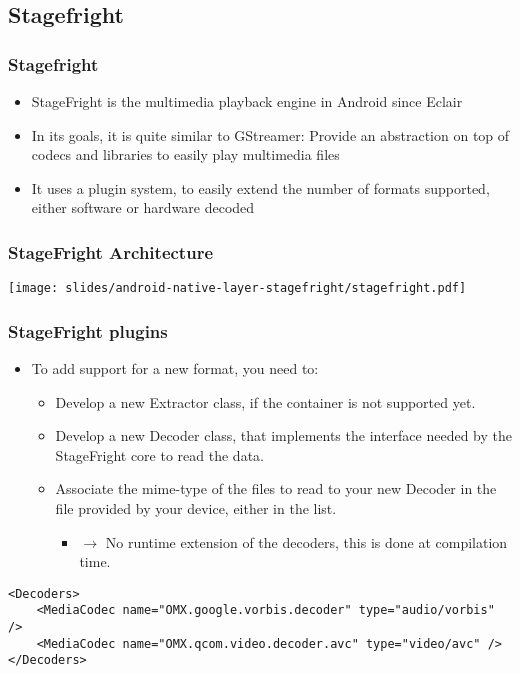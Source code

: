 \subsection{Stagefright}
\begin{frame}
  \frametitle{Stagefright}
  \begin{itemize}
  \item StageFright is the multimedia playback engine in Android since
    Eclair
  \item In its goals, it is quite similar to GStreamer: Provide an
    abstraction on top of codecs and libraries to easily play
    multimedia files
  \item It uses a plugin system, to easily extend the number of
    formats supported, either software or hardware decoded
  \end{itemize}
\end{frame}

\begin{frame}
  \frametitle{StageFright Architecture}
  \begin{center}
    \texttt{[image: slides/android-native-layer-stagefright/stagefright.pdf]}
  \end{center}
\end{frame}

\begin{frame}[fragile]
  \frametitle{StageFright plugins}
  \begin{itemize}
  \item To add support for a new format, you need to:
    \begin{itemize}
    \item Develop a new Extractor class, if the container is not
      supported yet.
    \item Develop a new Decoder class, that implements the interface
      needed by the StageFright core to read the data.
    \item Associate the mime-type of the files to read to your new
      Decoder in the  file provided by
      your device, either in the  list.
      \begin{itemize}
      \item $\rightarrow$ No runtime extension of the decoders, this
        is done at compilation time.
      \end{itemize}
    \end{itemize}
  \end{itemize}
\begin{verbatim}
<Decoders>
    <MediaCodec name="OMX.google.vorbis.decoder" type="audio/vorbis" />
    <MediaCodec name="OMX.qcom.video.decoder.avc" type="video/avc" />
</Decoders>
\end{verbatim}
\end{frame}

